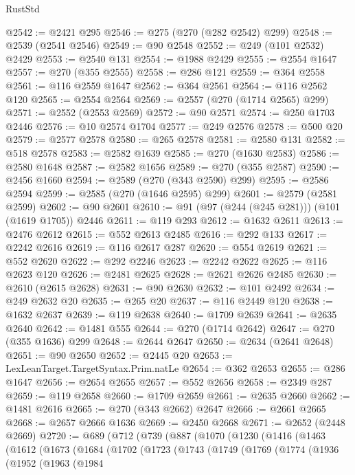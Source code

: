 \begin{lexlean}{RustStd}
\begin{coremodule}
@2542 := @2421 @295
@2546 := @275 (@270 (@282 @2542) @299)
@2548 := @2539 (@2541 @2546)
@2549 := @90 @2548
@2552 := @249 (@101 @2532) @2429
@2553 := @2540 @131
@2554 := @1988 @2429
@2555 := @2554 @1647
@2557 := @270 (@355 @2555)
@2558 := @286 @121
@2559 := @364 @2558
@2561 := @116 @2559 @1647
@2562 := @364 @2561
@2564 := @116 @2562 @120
@2565 := @2554 @2564
@2569 := @2557 (@270 (@1714 @2565) @299)
@2571 := @2552 (@2553 @2569)
@2572 := @90 @2571
@2574 := @250 @1703 @2446
@2576 := @10 @2574 @1704
@2577 := @249 @2576
@2578 := @500 @20
@2579 := @2577 @2578
@2580 := @265 @2578
@2581 := @2580 @131
@2582 := @518 @2578
@2583 := @2582 @1639
@2585 := @270 (@1630 @2583)
@2586 := @2580 @1648
@2587 := @2582 @1656
@2589 := @270 (@355 @2587)
@2590 := @2456 @1660
@2594 := @2589 (@270 (@343 @2590) @299)
@2595 := @2586 @2594
@2599 := @2585 (@270 (@1646 @2595) @299)
@2601 := @2579 (@2581 @2599)
@2602 := @90 @2601
@2610 := @91 (@97 (@244 (@245 @281))) (@101 (@1619 @1705)) @2446
@2611 := @119 @293
@2612 := @1632 @2611
@2613 := @2476 @2612
@2615 := @552 @2613 @2485
@2616 := @292 @133
@2617 := @2242 @2616
@2619 := @116 @2617 @287
@2620 := @554 @2619
@2621 := @552 @2620
@2622 := @292 @2246
@2623 := @2242 @2622
@2625 := @116 @2623 @120
@2626 := @2481 @2625
@2628 := @2621 @2626 @2485
@2630 := @2610 (@2615 @2628)
@2631 := @90 @2630
@2632 := @101 @2492
@2634 := @249 @2632 @20
@2635 := @265 @20
@2637 := @116 @2449 @120
@2638 := @1632 @2637
@2639 := @119 @2638
@2640 := @1709 @2639
@2641 := @2635 @2640
@2642 := @1481 @555
@2644 := @270 (@1714 @2642)
@2647 := @270 (@355 @1636) @299
@2648 := @2644 @2647
@2650 := @2634 (@2641 @2648)
@2651 := @90 @2650
@2652 := @2445 @20
@2653 := LexLeanTarget.TargetSyntax.Prim.natLe
@2654 := @362 @2653
@2655 := @286 @1647
@2656 := @2654 @2655
@2657 := @552 @2656
@2658 := @2349 @287
@2659 := @119 @2658
@2660 := @1709 @2659
@2661 := @2635 @2660
@2662 := @1481 @2616
@2665 := @270 (@343 @2662) @2647
@2666 := @2661 @2665
@2668 := @2657 @2666 @1636
@2669 := @2450 @2668
@2671 := @2652 (@2448 @2669)
@2720 := @689
    (@712
      (@739
        (@887
          (@1070
            (@1230
              (@1416
                (@1463
                  (@1612
                    (@1673
                      (@1684
                        (@1702
                          (@1723
                            (@1743
                              (@1749
                                (@1769
                                  (@1774
                                    (@1936
                                      (@1952
                                        (@1963
                                          (@1984

\end{coremodule}
\end{lexlean}
